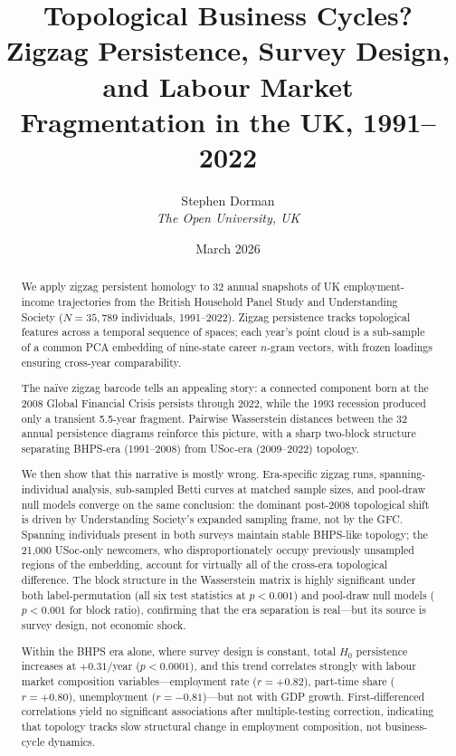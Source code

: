 \documentclass[12pt, a4paper]{article}
\title{Topological Business Cycles?\\
  Zigzag Persistence, Survey Design, and Labour Market\\
  Fragmentation in the UK, 1991--2022}
\author{%
  Stephen Dorman\\
  \textit{The Open University, UK}
}
\date{March 2026}
\newcommand{\HH}[1]{H_{#1}}    %
\begin{document}
\maketitle

\begin{abstract}
We apply zigzag persistent homology to 32 annual snapshots of UK
employment-income trajectories from the British Household Panel Study and
Understanding Society ($N = 35{,}789$ individuals, 1991--2022).
Zigzag persistence tracks topological features across a temporal sequence of
spaces; each year's point cloud is a sub-sample of a common PCA embedding of
nine-state career $n$-gram vectors, with frozen loadings ensuring cross-year
comparability.

The na\"ive zigzag barcode tells an appealing story: a connected component born
at the 2008 Global Financial Crisis persists through 2022, while the 1993
recession produced only a transient 5.5-year fragment.
Pairwise Wasserstein distances between the 32 annual persistence diagrams
reinforce this picture, with a sharp two-block structure separating BHPS-era
(1991--2008) from USoc-era (2009--2022) topology.

We then show that this narrative is mostly wrong.
Era-specific zigzag runs, spanning-individual analysis, sub-sampled Betti curves
at matched sample sizes, and pool-draw null models converge on the same
conclusion: the dominant post-2008 topological shift is driven by Understanding
Society's expanded sampling frame, not by the GFC.
Spanning individuals present in both surveys maintain stable BHPS-like topology;
the 21,000 USoc-only newcomers, who disproportionately occupy previously
unsampled regions of the embedding, account for virtually all of the cross-era
topological difference.
The block structure in the Wasserstein matrix is highly significant under both
label-permutation (all six test statistics at $p < 0.001$) and pool-draw null
models ($p < 0.001$ for block ratio), confirming that the era separation is
real---but its source is survey design, not economic shock.

Within the BHPS era alone, where survey design is constant, total $\HH{0}$
persistence increases at $+0.31$/year ($p < 0.0001$), and this trend correlates
strongly with labour market composition variables---employment rate ($r = +0.82$),
part-time share ($r = +0.80$), unemployment ($r = -0.81$)---but not with GDP
growth.
First-differenced correlations yield no significant associations after
multiple-testing correction, indicating that topology tracks slow structural
change in employment composition, not business-cycle dynamics.


\end{abstract}
\end{document}

